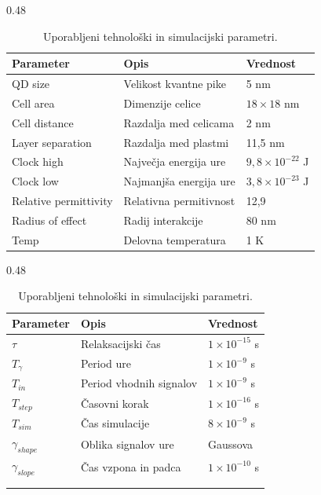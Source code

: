 \documentclass[graybox, envcountchap]{svmult}
\begin{document}
\begin{table}[htbp]
    \centering
    \scriptsize
    
    \begin{subtable}[t]{0.48\textwidth}
        \centering
        \caption{Tehnološki parametri}
        \label{tab:tehnoloski}
        \begin{tabular}{lll}
            \toprule
            Parameter & Opis & Vrednost \\
            \midrule
            QD size & Velikost kvantne pike & 5 nm \\
            Cell area & Dimenzije celice & $18 \times 18$ nm \\
            Cell distance & Razdalja med celicama & 2 nm \\
            Layer separation & Razdalja med plastmi & 11,5 nm \\
            Clock high & Največja energija ure & $9,8 \times 10^{-22}$ J \\
            Clock low & Najmanjša energija ure & $3,8 \times 10^{-23}$ J \\
            Relative permittivity & Relativna permitivnost & 12,9 \\
            Radius of effect & Radij interakcije & 80 nm \\
            Temp & Delovna temperatura & 1 K \\
            \bottomrule
        \end{tabular}
    \end{subtable}
    \hfill
    \begin{subtable}[t]{0.48\textwidth}
        \centering
        \caption{Simulacijski parametri}
        \label{tab:simulacijski}
        \begin{tabular}{lll}
            \toprule
            Parameter & Opis & Vrednost \\
            \midrule
            $\tau$ & Relaksacijski čas & $1 \times 10^{-15}$ s \\
            $T_{\gamma}$ & Period ure & $1 \times 10^{-9}$ s \\
            $T_{in}$ & Period vhodnih signalov & $1 \times 10^{-9}$ s \\
            $T_{step}$ & Časovni korak & $1 \times 10^{-16}$ s \\
            $T_{sim}$ & Čas simulacije & $8 \times 10^{-9}$ s \\
            $\gamma_{shape}$ & Oblika signalov ure & Gaussova \\
            $\gamma_{slope}$ & Čas vzpona in padca & $1 \times 10^{-10}$ s \\
            & & \\
            & & \\
            \bottomrule
        \end{tabular}
    \end{subtable}
    \caption{Uporabljeni tehnološki in simulacijski parametri.}
    \label{tab:parametri}
\end{table}
 
\end{document}
